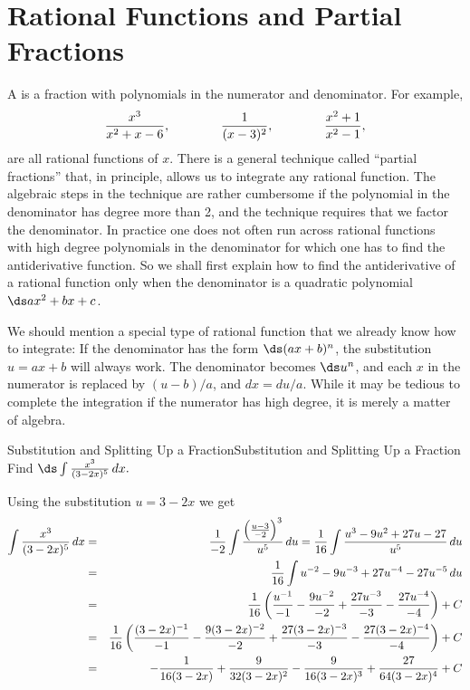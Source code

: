 \section{Rational Functions and Partial Fractions}{}{}\label{sec:Rational Functions}
A  is a fraction with polynomials in the numerator and
denominator.  For example, 
$$
  {x^3\over x^2+x-6},
  \qquad\qquad
  {1\over (x-3)^2},
  \qquad\qquad
  {x^2+1\over x^2-1},
$$ 
are all rational functions of $x$.  There is a general technique
called ``partial fractions'' that, in principle, allows us to 
integrate any rational function.  The
algebraic steps in the technique are rather cumbersome if the
polynomial in the denominator has degree more than 2, and the
technique requires that we factor the denominator. In practice one does not often run
across rational functions with high degree polynomials in the
denominator for which one has to find the antiderivative function.  So
we shall first explain how to find the antiderivative of a rational function
only when the denominator is a quadratic polynomial $\ds ax^2+bx+c$.

We should mention a special type of rational function that we already
know how to integrate: If the denominator has the form $\ds (ax+b)^n$,
the substitution $u=ax+b$ will always work.  The denominator becomes
$\ds u^n$, and each $x$ in the numerator is replaced by $(u-b)/a$, and
$dx=du/a$. While it may be tedious to complete the integration if the
numerator has high degree, it is merely a matter of algebra.

\begin{example}{Substitution and Splitting Up a Fraction}{Substitution and Splitting Up a Fraction}\label{Substitution and Splitting Up a Fraction}
Find $\ds\int{x^3\over(3-2x)^5}\,dx.$ 
\end{example}

\begin{solution}
Using the substitution 
$u=3-2x$ we get
\begin{eqnarray*}
  \int{x^3\over(3-2x)^5}\,dx
  &=&{1\over -2}\int {\left({u-3\over-2}\right)^3\over u^5}\,du
  ={1\over 16}\int {u^3-9u^2+27u-27\over u^5}\,du\cr
  &=&{1\over 16}\int u^{-2}-9u^{-3}+27u^{-4}-27u^{-5}\,du\cr
  &=&{1\over 16}\left({u^{-1}\over-1}-{9u^{-2}\over-2}+{27u^{-3}\over-3}
  -{27u^{-4}\over-4}\right)+C\cr
  &=&{1\over 16}\left({(3-2x)^{-1}\over-1}-{9(3-2x)^{-2}\over-2}+
  {27(3-2x)^{-3}\over-3}
  -{27(3-2x)^{-4}\over-4}\right)+C\cr
  &=&-{1\over
    16(3-2x)}+{9\over32(3-2x)^2}-{9\over16(3-2x)^3}+{27\over64(3-2x)^4}+C
\end{eqnarray*}
\vglue-10pt
\end{solution}

